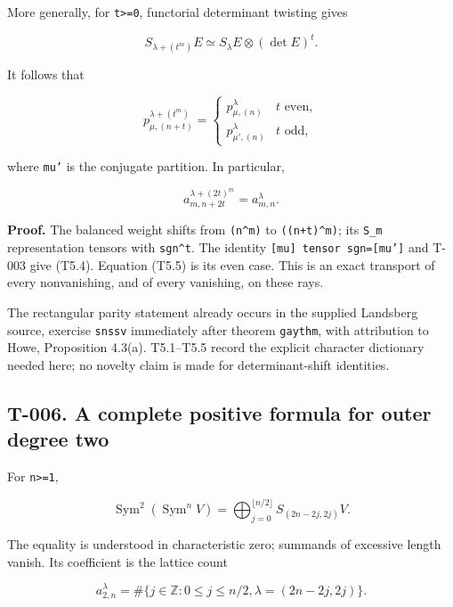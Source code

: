 \documentclass[
  10pt,
]{article}
\begin{document}
More generally, for \texttt{\small t>=\allowbreak{}0}, functorial
determinant twisting gives

\[
S_{\lambda+(t^m)}E\simeq S_\lambda E\otimes(\det E)^t.
\]

It follows that

\[
p_{\mu,(n+t)}^{\lambda+(t^m)}
=\begin{cases}
p_{\mu,(n)}^\lambda&t\text{ even},\\
p_{\mu',(n)}^\lambda&t\text{ odd},
\end{cases}
\tag{T5.4}
\]

where \texttt{\small mu'} is the conjugate partition. In particular,

\[
\boxed{a_{m,n+2t}^{\lambda+(2t)^m}=a_{m,n}^{\lambda}}.
\tag{T5.5}
\]

\textbf{Proof.} The balanced weight shifts from
\texttt{\small (\allowbreak{}n\textasciicircum{}m)\allowbreak{}} to
\texttt{\small (\allowbreak{}(\allowbreak{}n+\allowbreak{}t)\allowbreak{}\textasciicircum{}m)\allowbreak{}};
its \texttt{\small S\_\allowbreak{}m} representation tensors with
\texttt{\small sgn\textasciicircum{}t}. The identity
\texttt{\small [\allowbreak{}mu]\allowbreak{} tensor sgn=\allowbreak{}[\allowbreak{}mu']\allowbreak{}}
and T-003 give (T5.4). Equation (T5.5) is its even case. This is an
exact transport of every nonvanishing, and of every vanishing, on these
rays.

The rectangular parity statement already occurs in the supplied
Landsberg source, exercise \texttt{\small snssv} immediately after
theorem \texttt{\small gaythm}, with attribution to Howe, Proposition
4.3(a). T5.1--T5.5 record the explicit character dictionary needed here;
no novelty claim is made for determinant-shift identities.

\subsection{T-006. A complete positive formula for outer degree
two}\label{t-006.-a-complete-positive-formula-for-outer-degree-two}

For \texttt{\small n>=\allowbreak{}1},

\[
\boxed{\operatorname{Sym}^2(\operatorname{Sym}^n V)
=\bigoplus_{j=0}^{\lfloor n/2\rfloor}S_{(2n-2j,2j)}V.}
\tag{T6.1}
\]

The equality is understood in characteristic zero; summands of excessive
length vanish. Its coefficient is the lattice count

\[
a_{2,n}^\lambda
=\#\{j\in\mathbb Z:0\le j\le n/2,
\lambda=(2n-2j,2j)\}.
\tag{T6.2}
\]
\end{document}
